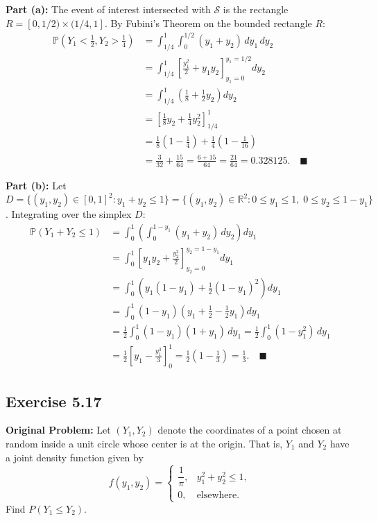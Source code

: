 \documentclass[11pt, letterpaper]{article}
\theoremstyle{definition}
\theoremstyle{remark}
\newcommand{\Prob}{\mathbb{P}}
\begin{document}
\textbf{Part (a):} The event of interest intersected with $\mathcal{S}$ is the rectangle $R = [0, 1/2) \times (1/4, 1]$. By Fubini's Theorem on the bounded rectangle $R$:
\begin{align*}
    \Prob\left(Y_1 < \frac{1}{2}, Y_2 > \frac{1}{4}\right) &= \int_{1/4}^1 \int_0^{1/2} (y_1 + y_2) \, dy_1 \, dy_2 \\
    &= \int_{1/4}^1 \left[ \frac{y_1^2}{2} + y_1 y_2 \right]_{y_1=0}^{y_1=1/2} dy_2 \\
    &= \int_{1/4}^1 \left( \frac{1}{8} + \frac{1}{2}y_2 \right) dy_2 \\
    &= \left[ \frac{1}{8}y_2 + \frac{1}{4}y_2^2 \right]_{1/4}^1 \\
    &= \frac{1}{8}\left(1 - \frac{1}{4}\right) + \frac{1}{4}\left(1 - \frac{1}{16}\right) \\
    &= \frac{3}{32} + \frac{15}{64} = \frac{6 + 15}{64} = \frac{21}{64} = 0.328125. \quad \blacksquare
\end{align*}

\textbf{Part (b):} Let $D = \{(y_1, y_2) \in [0, 1]^2 : y_1 + y_2 \le 1\} = \{(y_1, y_2) \in \mathbb{R}^2 : 0 \le y_1 \le 1, \; 0 \le y_2 \le 1 - y_1\}$. Integrating over the simplex $D$:
\begin{align*}
    \Prob(Y_1 + Y_2 \le 1) &= \int_0^1 \left( \int_0^{1 - y_1} (y_1 + y_2) \, dy_2 \right) dy_1 \\
    &= \int_0^1 \left[ y_1 y_2 + \frac{y_2^2}{2} \right]_{y_2=0}^{y_2=1-y_1} dy_1 \\
    &= \int_0^1 \left( y_1(1 - y_1) + \frac{1}{2}(1 - y_1)^2 \right) dy_1 \\
    &= \int_0^1 (1 - y_1) \left( y_1 + \frac{1}{2} - \frac{1}{2}y_1 \right) dy_1 \\
    &= \frac{1}{2} \int_0^1 (1 - y_1)(1 + y_1) \, dy_1 = \frac{1}{2} \int_0^1 (1 - y_1^2) \, dy_1 \\
    &= \frac{1}{2} \left[ y_1 - \frac{y_1^3}{3} \right]_0^1 = \frac{1}{2} \left( 1 - \frac{1}{3} \right) = \frac{1}{3}. \quad \blacksquare
\end{align*}

\subsection{Exercise 5.17}

\textbf{Original Problem:}
Let $(Y_1, Y_2)$ denote the coordinates of a point chosen at random inside a unit circle whose center is at the origin. That is, $Y_1$ and $Y_2$ have a joint density function given by
\[ f(y_1, y_2) = \begin{cases} \dfrac{1}{\pi}, & y_1^2 + y_2^2 \le 1, \\ 0, & \text{elsewhere.} \end{cases} \]
Find $P(Y_1 \le Y_2)$.
\end{document}
